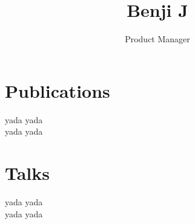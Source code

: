 \documentclass{article}
\title{Benji J}
\author{Product Manager} \date{}
\begin{document}
\maketitle
\thispagestyle{empty}

\vspace{1cm}



\vspace{1cm}

\begin{minipage}[t]{0.55\textwidth}

\section*{Publications}
yada yada \\
yada yada
\vspace{2em}
\end{minipage}\hfill

\begin{minipage}[t]{0.4\textwidth}
\section*{Talks}
yada yada \\
yada yada
\end{minipage}
\end{document}
